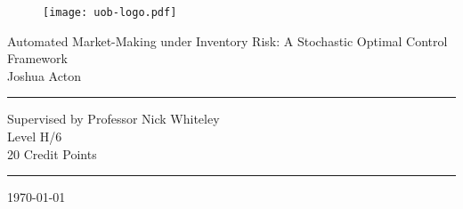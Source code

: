 \thispagestyle{plain}
\begin{titlepage}
    \begin{figure}[h]
        \begin{center}
            \texttt{[image: uob-logo.pdf]} 
        \end{center}
    \end{figure}

    \begin{center}
        {\Large Automated Market-Making under Inventory Risk: A Stochastic Optimal Control Framework\\ \vspace{1cm}Joshua Acton}
    \end{center}

    \vspace{3cm}
    \hrule
    \begin{center}
        Supervised by Professor Nick Whiteley\\
        Level H/6\\
        20 Credit Points\\
        \vspace{4mm}
    \end{center}
    \hrule

    \vspace{3cm}
    \begin{center}
        \today
    \end{center}
\end{titlepage}
